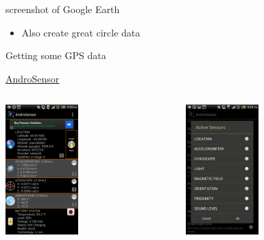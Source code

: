 \documentclass[sans,aspectratio=169,presentation,bigger,fleqn]{beamer}
\begin{document}
\begin{frame}[label=sec-23]{screenshot of Google Earth}
\begin{itemize}
\item Also create great circle data
\end{itemize}
\end{frame}

\begin{frame}[label=sec-24]{Getting some GPS data}
\begin{center}
\href{https://play.google.com/store/apps/details?id=com.fivasim.androsensor&hl=en}{\uline{AndroSensor}}
\end{center}

\begin{columns}
\begin{column}{0.45\textwidth}
\begin{center}
\includegraphics[height=5cm]{./img/andro-main.png}
\end{center}
\end{column}
\begin{column}{0.45\textwidth}
\begin{center}
\includegraphics[height=5cm]{./img/andro-sensors.png}
\end{center}
\end{column}
\end{columns}
\end{frame}
\end{document}
